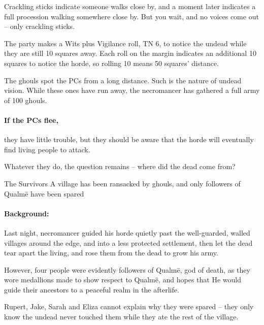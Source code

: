 \begin{multicols}{2}
\begin{boxtext}

  Crackling sticks indicate someone walks close by, and a moment later indicates a full procession walking somewhere close by.
  But you wait, and no voices come out -- only crackling sticks.

\end{boxtext}

The party makes a Wits plus Vigilance roll, TN 6, to notice the undead while they are still 10 squares away.
Each roll on the margin indicates an additional 10 squares to notice the horde, so rolling 10 means 50 squares' distance.

The ghouls spot the PCs from a long distance.
Such is the nature of undead vision.%
\iftoggle{core}%
  {See the core rules, page \pageref{undead}.}
  {}
While these ones have run away, the necromancer has gathered a full army of 100 ghouls.

\paragraph{If the PCs flee,}
they have little trouble, but they should be aware that the horde will eventually find living people to attack.

Whatever they do, the question remains -- where did the dead come from?

{The Survivors}%
{A village has been ransacked by ghouls, and only followers of Qualm\"{e} have been spared}%

\paragraph{Background:}
Last night, \gls{necromancer} guided his horde quietly past the well-guarded, walled villages around the \gls{edge}, and into a less protected settlement, then let the dead tear apart the living, and rose them from the dead to grow his army.

However, four people were evidently followers of Qualm\"{e}, god of death, as they wore medallions made to show respect to Qualm\"{e}, and hopes that He would guide their ancestors to a peaceful realm in the afterlife.

Rupert, Jake, Sarah and Eliza cannot explain why they were spared -- they only know the undead never touched them while they ate the rest of the village.

\begin{boxtext}


\end{boxtext}
\end{multicols}
